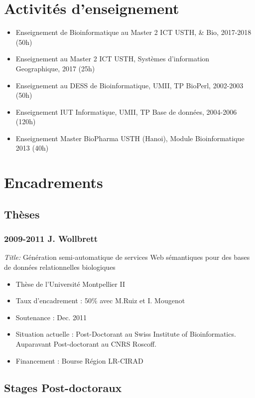 \section{Activités d’enseignement}
\begin{itemize}
\item Enseignement de Bioinformatique au Master 2 ICT USTH, \& Bio, 2017-2018 (50h)
\item Enseignement au Master 2 ICT USTH, Systèmes d’information Geographique, 2017 (25h)
\item Enseignement au DESS de Bioinformatique, UMII, TP BioPerl, 2002-2003 (50h)
\item Enseignement IUT Informatique, UMII, TP Base de données, 2004-2006 (120h)
\item Enseignement Master BioPharma USTH (Hanoi), Module Bioinformatique 2013 (40h)
\end{itemize}


\section{Encadrements}

\subsection*{Thèses}

\subsubsection*{2009-2011 J. Wollbrett}
\textit{Title:} Génération semi-automatique de services Web sémantiques pour des bases de données relationnelles biologiques

\begin{itemize}
\item Thèse de l’Université Montpellier II
\item Taux d’encadrement : 50\% avec M.Ruiz et I. Mougenot
\item Soutenance : Dec. 2011
\item Situation actuelle : Post-Doctorant au Swiss Institute of Bioinformatics. Auparavant Post-doctorant au CNRS Roscoff.
\item Financement : Bourse Région LR-CIRAD

\end{itemize}


\subsection*{Stages Post-doctoraux}

